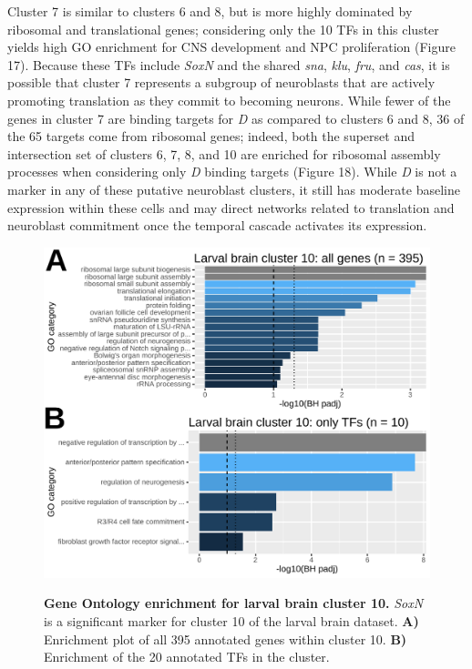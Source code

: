 \documentclass[withindex,glossary]{cam-thesis}
\begin{document}
Cluster 7 is similar to clusters 6 and 8, but is more highly dominated
by ribosomal and translational genes; considering only the 10 TFs in
this cluster yields high GO enrichment for CNS development and NPC
proliferation (Figure 17). Because these TFs include \emph{SoxN} and the
shared \emph{sna}, \emph{klu}, \emph{fru}, and \emph{cas}, it is
possible that cluster 7 represents a subgroup of neuroblasts that are
actively promoting translation as they commit to becoming neurons. While
fewer of the genes in cluster 7 are binding targets for \emph{D} as
compared to clusters 6 and 8, 36 of the 65 targets come from ribosomal
genes; indeed, both the superset and intersection set of clusters 6, 7,
8, and 10 are enriched for ribosomal assembly processes when considering
only \emph{D} binding targets (Figure 18). While \emph{D} is not a
marker in any of these putative neuroblast clusters, it still has
moderate baseline expression within these cells and may direct networks
related to translation and neuroblast commitment once the temporal
cascade activates its expression.

\setcounter{figure}{19-1}
\begin{figure}[htb]
\centering
\includegraphics[width=\dimexpr.75\textwidth\relax,keepaspectratio]{figs/Fig19 avalos cluster10.pdf}
\label{fig19}
\caption{\textbf{Gene Ontology enrichment for larval brain cluster 10.} \emph{SoxN} is a significant marker for cluster 10 of the larval brain dataset. \textbf{A)} Enrichment plot of all 395 annotated genes within cluster 10. \textbf{B)} Enrichment of the 20 annotated TFs in the cluster.}
\end{figure}
\end{document}
